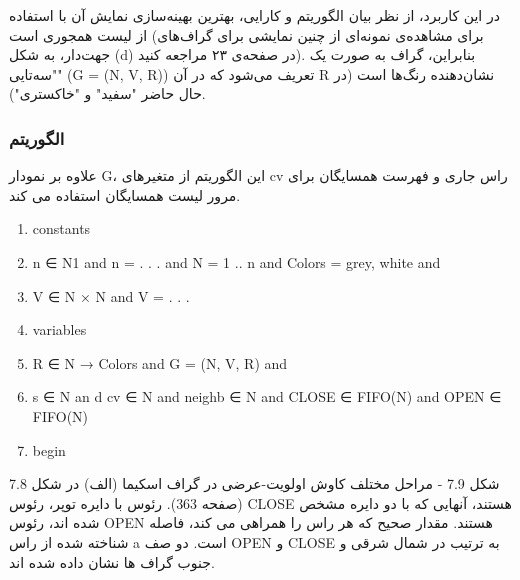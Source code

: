 \documentclass{book} %
\begin{document}
در این کاربرد، از نظر بیان الگوریتم و کارایی، بهترین بهینه‌سازی نمایش آن با استفاده از لیست همجوری است (برای مشاهده‌ی نمونه‌ای از چنین نمایشی برای گراف‌های جهت‌دار، به شکل (d) در صفحه‌ی ۲۳ مراجعه کنید). بنابراین، گراف به صورت یک "سه‌تایی" (G = (N, V, R)) تعریف می‌شود که در آن R نشان‌دهنده رنگ‌ها است (در حال حاضر "سفید" و "خاکستری").

\subsubsection*{الگوریتم}

علاوه بر نمودار G، این الگوریتم از متغیرهای cv راس جاری و فهرست همسایگان برای مرور لیست همسایگان استفاده می کند.

\begin{latin}
    
    \begin{enumerate}
        
        \item constants
        \item n ∈ N1 and n = . . . and N = 1 .. n and Colors = {grey, white} and
        \item V ∈ N × N and V = {. . .}
        \item variables
        \item R ∈ N → Colors and G = (N, V, R) and
        \item s ∈ N an d cv ∈ N and neighb ∈ N and CLOSE ∈ FIFO(N) and OPEN ∈ FIFO(N)
        \item begin
        
        
    \end{enumerate}
    
\end{latin}

شکل 7.9 - مراحل مختلف کاوش اولویت-عرضی در گراف اسکیما (الف) در شکل 7.8 (صفحه 363). رئوس با دایره توپر، رئوس CLOSE هستند، آنهایی که با دو دایره مشخص شده اند، رئوس OPEN هستند. مقدار صحیح که هر راس را همراهی می کند، فاصله شناخته شده از راس a است. دو صف OPEN و CLOSE به ترتیب در شمال شرقی و جنوب گراف ها نشان داده شده اند.
\end{document}
